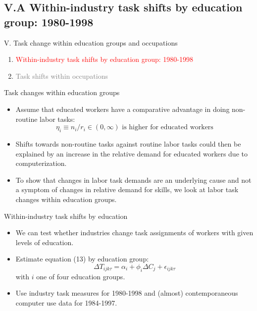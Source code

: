 \documentclass[notes=show]{beamer}
\begin{document}
\subsection{V.A Within-industry task shifts by education group: 1980-1998}

\begin{frame}{V. Task change within education groups and occupations}
\begin{enumerate}
\item[\textcolor{red}{V.A}] \textcolor{red}{Within-industry task shifts by education group: 1980-1998}  \bigskip
\item[\textcolor{gray}{V.B}]  \textcolor{gray}{Task shifts within occupations}
\end{enumerate}
\end{frame}

\begin{frame}{Task changes within education groups}
\begin{itemize}
\item Assume that educated workers have a comparative advantage in doing non-routine labor tasks:
\[
\eta_{i} \equiv n_{i}/r_{i} \in (0, \infty) \text{ is higher for educated workers}
\]
\item Shifts towards non-routine tasks against routine labor tasks could then be explained by an increase in the relative demand for educated workers due to computerization.\medskip
\item To show that changes in labor task demands are an underlying cause and not a symptom of changes in relative demand for skills, we look at labor task changes within education groups.
\end{itemize}
\end{frame}

\begin{frame}{Within-industry task shifts by education}
\begin{itemize}
\item We can test whether industries change task assignments of workers with given levels of education.\medskip
\item Estimate equation (13) by education group:
\[
\Delta T_{ijk \tau} = \alpha_{i} + \phi_{i} \Delta C_{j} + \epsilon_{ijk \tau} \tag{15} \label{eq15}
\]
with $i$ one of four education groups. \medskip
\item Use industry task measures for 1980-1998 and (almost) contemporaneous computer use data for 1984-1997.
\end{itemize}
\end{frame}
\end{document}

